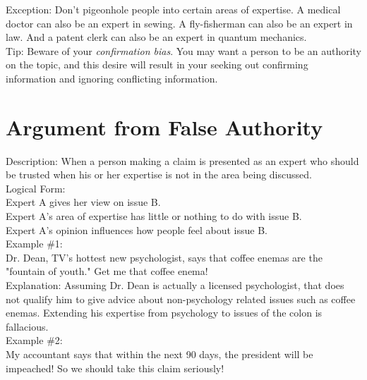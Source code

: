 \documentclass[a4paper,12pt,single,pdftex]{scrartcl}
\begin{document}
    
      Exception: Don’t pigeonhole people into certain areas of expertise. A medical doctor can also be an expert in sewing. A fly-fisherman can also be an expert in law. And a patent clerk can also be an expert in quantum mechanics.
    \\

    
      Tip: Beware of your {\it confirmation bias}. You may want a person to be an authority on the topic, and this desire will result in your seeking out confirming information and ignoring conflicting information.
    \\

    \section{
      Argument from False Authority
    }
  
    

    
      Description: When a person making a claim is presented as an expert who should be trusted when his or her expertise is not in the area being discussed.
    \\

    
      Logical Form:
    \\

    
      Expert A gives her view on issue B.
    \\

    
      Expert A's area of expertise has little or nothing to do with issue B.
    \\

    
      Expert A's opinion influences how people feel about issue B.
    \\

    
      Example \#1:
    \\

    
      Dr. Dean, TV's hottest new psychologist, says that coffee enemas are the "fountain of youth." Get me that coffee enema!
    \\

    
      Explanation: Assuming Dr. Dean is actually a licensed psychologist, that does not qualify him to give advice about non-psychology related issues such as coffee enemas. Extending his expertise from psychology to issues of the colon is fallacious.
    \\

    
      Example \#2:
    \\

    
      My accountant says that within the next 90 days, the president will be impeached! So we should take this claim seriously!
    \\
\end{document}
